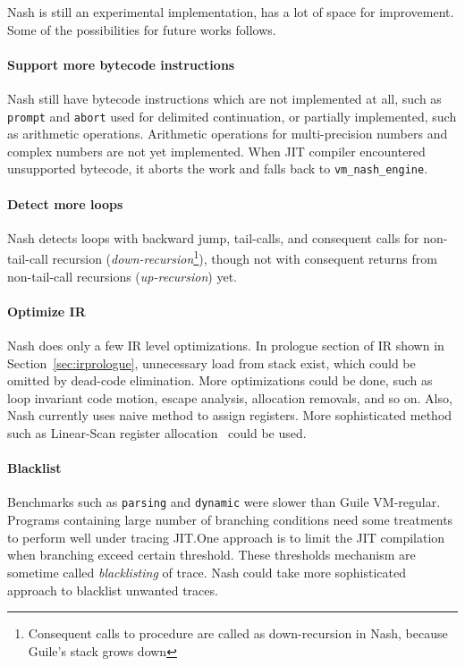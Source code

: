 \documentclass[preprint, 10pt]{sigplanconf}
\begin{document}
Nash is still an experimental implementation, has a lot of space for
improvement. Some of the possibilities for future works follows.

\paragraph{Support more bytecode instructions} Nash still have bytecode
instructions which are not implemented at all, such as \texttt{prompt} and
\texttt{abort} used for delimited continuation, or partially implemented, such
as arithmetic operations. Arithmetic operations for multi-precision numbers
and complex numbers are not yet implemented. When JIT compiler encountered
unsupported bytecode, it aborts the work and falls back to
\texttt{vm\_nash\_engine}.

\paragraph{Detect more loops} Nash detects loops with backward jump,
tail-calls, and consequent calls for non-tail-call recursion
(\textit{down-recursion}\footnote{Consequent calls to procedure are called as
  down-recursion in Nash, because Guile's stack grows down}), though not with
consequent returns from non-tail-call recursions (\textit{up-recursion}) yet.


\paragraph{Optimize IR} Nash does only a few IR level
optimizations. In prologue section of IR shown in
Section~\hyperref[sec:irprologue]{\ref{sec:irprologue}}, unnecessary load from
stack exist, which could be omitted by dead-code elimination. More optimizations
could be done, such as loop invariant code motion, escape analysis, allocation
removals, and so on. Also, Nash currently uses naive method to assign
registers. More sophisticated method such as Linear-Scan register
allocation~\cite{poletto1999linear} could be used.

\paragraph{Blacklist} Benchmarks such as \texttt{parsing} and
\texttt{dynamic} were slower than Guile VM-regular. Programs containing large
number of branching conditions need some treatments to perform well under
tracing JIT.\@ One approach is to limit the JIT compilation when branching
exceed certain threshold. These thresholds mechanism are sometime called
\textit{blacklisting} of trace. Nash could take more sophisticated approach to
blacklist unwanted traces.
\end{document}
